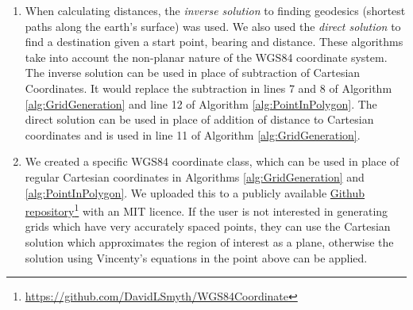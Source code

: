 \begin{enumerate}
    \item When calculating distances, the \textit{inverse solution} \cite{Vincenty1975DirectEquations} to finding geodesics (shortest paths along the earth's surface) was used. We also used the \textit{direct solution} \cite{Vincenty1975DirectEquations} to find a destination given a start point, bearing and distance. These algorithms take into account the non-planar nature of the WGS84 coordinate system. The inverse solution can be used in place of subtraction of Cartesian Coordinates. It would replace the subtraction in lines 7 and 8 of Algorithm \ref{alg:GridGeneration} and line 12 of Algorithm \ref{alg:PointInPolygon}. The direct solution can be used in place of addition of distance to Cartesian coordinates and is used in line 11 of Algorithm \ref{alg:GridGeneration}.
    
    \item We created a specific WGS84 coordinate class, which can be used in place of regular Cartesian coordinates in Algorithms \ref{alg:GridGeneration} and \ref{alg:PointInPolygon}. We uploaded this to a publicly available  \href{https://github.com/DavidLSmyth/WGS84Coordinate}{Github repository}\footnote{\href {https://github.com/DavidLSmyth/WGS84Coordinate}{https://github.com/DavidLSmyth/WGS84Coordinate}} with an MIT licence. If the user is not interested in generating grids which have very accurately spaced points, they can use the Cartesian solution which approximates the region of interest as a plane, otherwise the solution using Vincenty's equations in the point above can be applied.
\end{enumerate}


